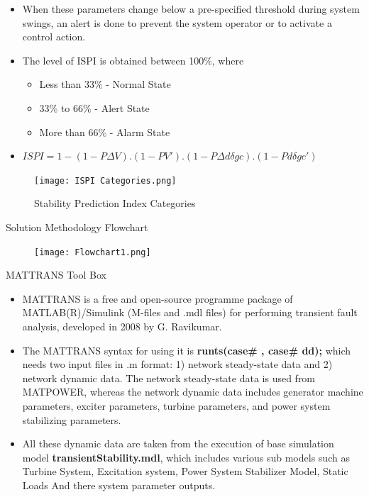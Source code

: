 \documentclass [xcolor=svgnames, t] {beamer}
\begin{document}
\begin{frame}
\begin{itemize}
\item When these parameters change below a pre-specified threshold during system swings, an alert is done to prevent the system operator or to activate a control action.
\item The level of ISPI is obtained between 100\%, where
\begin{itemize}
\item Less than 33\% - Normal State
\item 33\% to 66\% - Alert State
\item More than 66\% - Alarm State
\end{itemize}
\item $ISPI = 1-(1-P\Delta V).(1-PV').(1-P\Delta d \delta gc).(1-Pd \delta gc')$
\end{itemize}
\begin{figure}[H]
	 \centering
	\texttt{[image: ISPI Categories.png]}
	\caption{Stability Prediction Index Categories}
	\label{ISPI Categories}
\end{figure}
\end{frame}

\begin{frame}{Solution Methodology Flowchart}
\begin{figure}[H]
	 \centering
	\texttt{[image: Flowchart1.png]}
	
\end{figure}
\end{frame}

\begin{frame}{MATTRANS Tool Box}
\begin{itemize}
\justifying
\item MATTRANS is a free and open-source programme package of MATLAB(R)/Simulink (M-files and .mdl files) for performing transient fault analysis, developed in 2008 by G. Ravikumar. 
\item The MATTRANS syntax for using it is \textbf{runts(case\# , case\# dd);} which needs two input files in .m format: 1) network steady-state data and 2) network dynamic data. The network steady-state data is used from MATPOWER, whereas the network dynamic data includes generator machine parameters, exciter parameters, turbine parameters, and power system stabilizing parameters.  
\item All these dynamic data are taken from the execution of base simulation model \textbf{transientStability.mdl}, which includes various sub models such as Turbine System, Excitation system, Power System Stabilizer Model, Static Loads And there system parameter outputs.
\end{itemize}
\end{frame}
\end{document}
